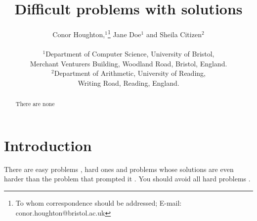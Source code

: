 



\title{Difficult problems with solutions} 

\author
{Conor Houghton,$^{1}$\footnote{To whom correspondence should be addressed; E-mail:  conor.houghton@bristol.ac.uk} Jane Doe$^{1}$ and Sheila Citizen$^{2}$\\
\\
\normalsize{$^{1}$Department of Computer Science, University of Bristol,}\\
\normalsize{Merchant Venturers Building, Woodland Road, Bristol, England.}\\
\normalsize{$^{2}$Department of Arithmetic, University of Reading,}\\
\normalsize{Writing Road, Reading, England.}\\
}

\date{}

\maketitle


\begin{abstract}
There are none
\end{abstract}


\section{Introduction}
There are easy problems \cite{BrainBrainBrain1902a}, hard ones \cite{LightKnight2007a} and problems whose solutions are even harder than the problem that prompted it \cite{Swift1729a}. You should avoid all hard problems \cite{LightKnight2007a,Swift1729a}.


